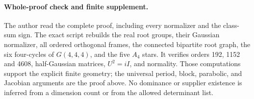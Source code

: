 \paragraph{Whole-proof check and finite supplement.}
The author read the complete proof, including every normalizer and
the class-sum sign. The exact script
 rebuilds the real
root groups, their Gaussian normalizer, all ordered orthogonal frames,
the connected bipartite root graph, the six four-cycles of
\(G(4,4,4)\), and the five \(A_4\) stars. It verifies orders 192,
1152 and 4608, half-Gaussian matrices, \(U^2=iI\), and normality.
Those computations support the explicit finite geometry; the
universal period, block, parabolic, and Jacobian arguments are the
proof above. No dominance or supplier existence is inferred from a
dimension count or from the allowed determinant list.
